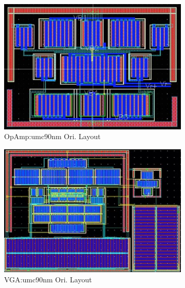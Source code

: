     \begin{figure}[ht]
      \centering
        \begin{subfigure}[t]{0.4\textwidth}
        \includegraphics[width=\textwidth]{Fig/ML_OPU90.eps}
        \caption{OpAmp:umc90nm Ori. Layout}\label{fig:ML_OPU90}
        \end{subfigure}
        \begin{subfigure}[t]{0.4\textwidth}
        \includegraphics[width=\textwidth]{Fig/ML_VGAU90.eps}
        \caption{VGA:umc90nm Ori. Layout}\label{fig:ML_VGAU90}
        \end{subfigure}
        \begin{subfigure}[t]{0.4\textwidth}

\end{subfigure}
\end{figure}
